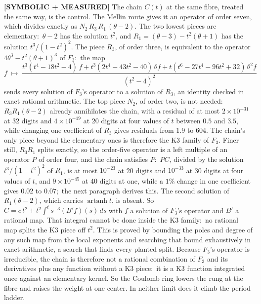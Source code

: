 \documentclass[aps,pra,twocolumn,superscriptaddress,longbibliography]{revtex4-2}
\begin{document}
\textbf{[SYMBOLIC + MEASURED]} The chain $C(t)$ at the same fibre, treated the same
way, is the control.  The Mellin route gives it an operator of order seven,
which divides exactly as $N_2\,R_3\,R_1\,(\theta-2)$.  The two lowest pieces
are elementary:\ $\theta-2$ has the solution $t^2$, and
$R_1=(\theta-3)-t^2(\theta+1)$ has the solution $t^3/(1-t^2)^2$.  The piece
$R_3$, of order three, is equivalent to the operator
$4\theta^3-t^2(\theta+1)^3$ of $F_3$:\ the map
\begin{equation}
  f\;\mapsto\;\frac{t^3(t^4-18t^2-4)\,f+t^3(2t^4-43t^2-40)\,\theta f
  +t(t^6-27t^4-96t^2+32)\,\theta^2 f}{(t^2-4)^2}
  \label{eq:chain_k3_map}
\end{equation}
sends every solution of $F_3$'s operator to a solution of $R_3$, an identity
checked in exact rational arithmetic.  The top piece $N_2$, of order two, is
not needed:\ $R_3R_1(\theta-2)$ already annihilates the chain, with a
residual of at most $2\times10^{-31}$ at 32 digits and $4\times10^{-19}$
at 20 digits at four values of $t$ between $0.5$ and $3.5$, while changing
one coefficient of $R_3$ gives residuals from 1.9 to 604.  The chain's only piece beyond the elementary ones is therefore
the K3 family of $F_3$.  Finer still, $R_3R_1$ splits exactly, so the order-five
operator is a left multiple of an operator $P$ of order four, and the chain
satisfies $P$:\ $PC$, divided by the solution $t^3/(1-t^2)^2$ of $R_1$, is
at most $10^{-23}$ at 20 digits and $10^{-33}$ at 30 digits at four values
of $t$, and $9\times10^{-45}$ at 40 digits at one, while a $1\%$ change in
one coefficient gives $0.02$ to $0.07$;\ the next paragraph derives this.  The second solution of
$R_1(\theta-2)$, which carries $\operatorname{artanh} t$, is absent.  So
$C=c\,t^2+t^2\int^t s^{-3}(B'f)(s)\,ds$ with $f$ a solution of $F_3$'s
operator and $B'$ a rational map.  That integral cannot be done inside the
K3 family:\ no rational map splits the K3 piece off $t^2$.  This is proved
by bounding the poles and degree of any such map from the local exponents
and searching that bound exhaustively in exact arithmetic, a search that
finds every planted split.  Because $F_3$'s operator is irreducible, the
chain is therefore not a rational combination of $F_3$ and its derivatives
plus any function without a K3 piece:\ it is a K3 function integrated once
against an elementary kernel.  So the
Coulomb ring lowers the rung at the fibre and raises the weight at one
center.  In neither limit does it climb the period ladder.
\end{document}
